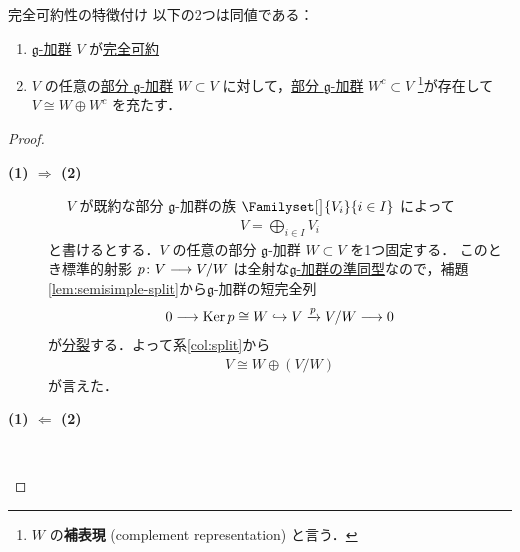 \documentclass[rep_main]{subfiles}
\begin{document}
\begin{myprop}[label=prop:reducible-1]{完全可約性の特徴付け}
	以下の2つは同値である：
	\begin{enumerate}
		\item \hyperref[ax:g-module]{ $\mathfrak{g}$-加群} $V$ が\hyperref[def:irr]{完全可約}
		\item $V$ の任意の\hyperref[def:gmod-directsum]{部分 $\mathfrak{g}$-加群} $W \subset V$ に対して，\hyperref[def:gmod-directsum]{部分 $\mathfrak{g}$-加群} $W^c \subset V$ \footnote{$W$ の\textbf{補表現} (complement representation) と言う．}が存在して $V \cong W \oplus W^c$ を充たす．
	\end{enumerate}
\end{myprop}

\begin{proof}
	\begin{description}
		\item[\textbf{(1) $\bm{\Longrightarrow}$ (2)}]　
		$V$ が既約な部分 $\mathfrak{g}$-加群の族 $\Familyset[\big]{V_i}{i \in I}$ によって
		\begin{align}
			\label{eq:ds1}
			V = \bigoplus_{i \in I} V_i 
		\end{align}
		と書けるとする．$V$ の任意の部分 $\mathfrak{g}$-加群 $W \subset V$ を1つ固定する．
		このとき標準的射影 $p \colon V \longrightarrow V/W$ は全射な\hyperref[def:g-module-hom]{$\mathfrak{g}$-加群の準同型}なので，補題\ref{lem:semisimple-split}から$\mathfrak{g}$-加群の短完全列
		\begin{align}
			0 \longrightarrow \operatorname{Ker} p \cong W \hookrightarrow V \xrightarrow{p} V/W \longrightarrow 0
		\end{align}
		が\hyperref[lem:splitting]{分裂}する．よって系\ref{col:split}から
		\begin{align}
			V \cong W \oplus (V/W)
		\end{align}
		が言えた．

		\item[\textbf{(1) $\bm{\Longleftarrow}$ (2)}]　
		

\end{description}
\end{proof}
\end{document}
